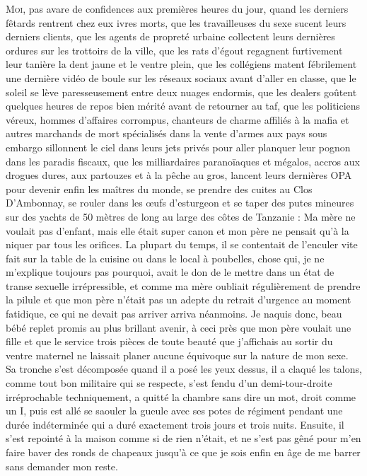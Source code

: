 \begin{dialogue}
\textsc{Moi}, pas avare de confidences aux premières heures du jour, quand les derniers fêtards rentrent chez eux ivres morts, que les travailleuses du sexe sucent leurs derniers clients, que les agents de propreté urbaine collectent leurs dernières ordures sur les trottoirs de la ville, que les rats d’égout regagnent furtivement leur tanière la dent jaune et le ventre plein, que les collégiens matent fébrilement une dernière vidéo de boule sur les réseaux sociaux avant d’aller en classe, que le soleil se lève paresseusement entre deux nuages endormis, que les dealers goûtent quelques heures de repos bien mérité avant de retourner au taf, que les politiciens véreux, hommes d’affaires corrompus, chanteurs de charme affiliés à la mafia et autres marchands de mort spécialisés dans la vente d’armes aux pays sous embargo sillonnent le ciel dans leurs jets privés pour aller planquer leur pognon dans les paradis fiscaux, que les milliardaires paranoïaques et mégalos, accros aux drogues dures, aux partouzes et à la pêche au gros, lancent leurs dernières OPA pour devenir enfin les maîtres du monde, se prendre des cuites au Clos D’Ambonnay, se rouler dans les œufs d’esturgeon et se taper des putes mineures sur des yachts de 50 mètres de long au large des côtes de Tanzanie : Ma mère ne voulait pas d’enfant, mais elle était super canon et mon père ne pensait qu’à la niquer par tous les orifices. La plupart du temps, il se contentait de l’enculer vite fait sur la table de la cuisine ou dans le local à poubelles, chose qui, je ne m’explique toujours pas pourquoi, avait le don de le mettre dans un état de transe sexuelle irrépressible, et comme ma mère oubliait régulièrement de prendre la pilule et que mon père n’était pas un adepte du retrait d’urgence au moment fatidique, ce qui ne devait pas arriver arriva néanmoins. Je naquis donc, beau bébé replet promis au plus brillant avenir, à ceci près que mon père voulait une fille et que le service trois pièces de toute beauté que j’affichais au sortir du ventre maternel ne laissait planer aucune équivoque sur la nature de mon sexe. Sa tronche s’est décomposée quand il a posé les yeux dessus, il a claqué les talons, comme tout bon militaire qui se respecte, s’est fendu d’un demi-tour-droite irréprochable techniquement, a quitté la chambre sans dire un mot, droit comme un I, puis est allé se saouler la gueule avec ses potes de régiment pendant une durée indéterminée qui a duré exactement trois jours et trois nuits. Ensuite, il s’est repointé à la maison comme si de rien n’était, et ne s’est pas gêné pour m’en faire baver des ronds de chapeaux jusqu’à ce que je sois enfin en âge de me barrer sans demander mon reste.


\end{dialogue}
